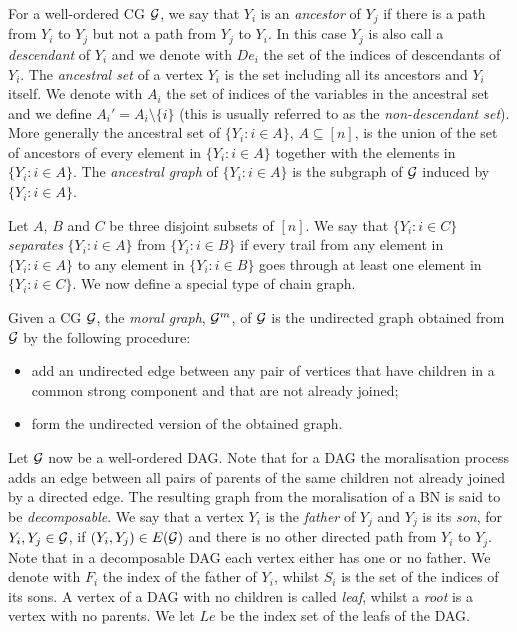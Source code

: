 For a well-ordered CG $\mathcal{G}$, we say that $Y_i$ is an \textit{ancestor} of $Y_j$ if there is a path from $Y_i$ to $Y_j$ but not a path from $Y_j$ to $Y_i$. In this case $Y_j$ is also call a \textit{descendant} of $Y_i$ and we denote with $De_i$ the set of the indices of descendants of $Y_i$. The \textit{ancestral set} of a vertex $Y_i$ is the set including all its ancestors and $Y_i$ itself. We denote with $A_i$ the set of indices of the variables in the ancestral set and we define $A_i'=A_i\setminus \{i\}$ (this is usually referred to as the \textit{non-descendant set}). More generally the ancestral set of  $\{Y_i:i\in A\}$, $A\subseteq [n]$, is the union of the set of ancestors of every element in $\{Y_i:i\in A\}$ together with the elements in $\{Y_i:i\in A\}$. The \textit{ancestral graph} of $\{Y_i:i\in A\}$ is the subgraph of $\mathcal{G}$ induced by $\{Y_i:i\in A\}$. 


 Let $A$, $B$ and $C$ be three disjoint subsets of $[n]$. We say that $\{Y_i:i\in C\}$ \textit{separates} $\{Y_i:i\in A\}$ from $\{Y_i:i\in B\}$ if every trail from any element in $\{Y_i:i\in A\}$ to any element in  $\{Y_i:i\in B\}$ goes through at least one element in $\{Y_i:i\in C\}$. We now define a special type of chain graph.
\begin{definition}
Given a CG $\mathcal{G}$, the \emph{moral graph}, $\mathcal{G}^m$, of $\mathcal{G}$ is the undirected graph obtained from $\mathcal{G}$ by the following procedure:
\begin{itemize}
\item add an undirected edge between any pair of vertices that have children in a common strong component and that are not already joined;
\item form the undirected version of the obtained graph.
\end{itemize}
\end{definition}

Let $\mathcal{G}$ now be a well-ordered DAG. Note that for a DAG the moralisation process  adds an edge between all pairs of parents of the same children not already joined by a directed edge. The resulting graph from the moralisation of a BN is said to be \textit{decomposable}. We say that a vertex $Y_i$ is the \textit{father} of $Y_j$ and $Y_j$ is its \textit{son}, for $Y_i,Y_j\in\mathcal{G}$, if $(Y_i,Y_j)\in E(\mathcal{G})$ and there is no other directed path from $Y_i$ to $Y_j$. Note that in a decomposable DAG each vertex either has one or no father. We denote with $F_i$ the index of the father of $Y_i$, whilst $S_i$ is the set of the indices of its sons. A vertex of a DAG with no children is called \textit{leaf}, whilst a \textit{root} is a vertex with no parents. We let $Le$ be the index set of the leafs of the DAG.


